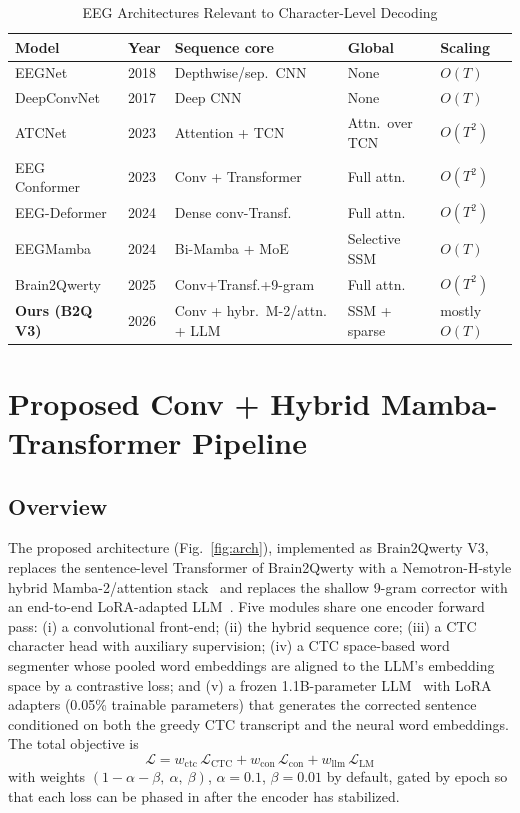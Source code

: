 \documentclass[conference]{IEEEtran}
\begin{document}
\begin{table}[t]
\centering
\caption{EEG Architectures Relevant to Character-Level Decoding}
\label{tab:eeg}
\scriptsize
\begin{tabular}{@{}lllll@{}}
\toprule
\textbf{Model} & \textbf{Year} & \textbf{Sequence core} & \textbf{Global} & \textbf{Scaling} \\
\midrule
EEGNet~\cite{lawhern2018eegnet} & 2018 & Depthwise/sep.\ CNN & None & $O(T)$ \\
DeepConvNet~\cite{schirrmeister2017} & 2017 & Deep CNN & None & $O(T)$ \\
ATCNet~\cite{altaheri2023atcnet} & 2023 & Attention + TCN & Attn.\ over TCN & $O(T^2)$ \\
EEG Conformer~\cite{song2023conformer} & 2023 & Conv + Transformer & Full attn. & $O(T^2)$ \\
EEG-Deformer~\cite{ding2024deformer} & 2024 & Dense conv-Transf. & Full attn. & $O(T^2)$ \\
EEGMamba~\cite{gui2024eegmamba} & 2024 & Bi-Mamba + MoE & Selective SSM & $O(T)$ \\
Brain2Qwerty~\cite{levy2025} & 2025 & Conv+Transf.+9-gram & Full attn. & $O(T^2)$ \\
\textbf{Ours (B2Q V3)} & 2026 & Conv + hybr.\ M-2/attn. + LLM & SSM + sparse & mostly $O(T)$ \\
\bottomrule
\end{tabular}
\end{table}

\section{Proposed Conv + Hybrid Mamba-Transformer Pipeline}

\subsection{Overview}
The proposed architecture (Fig.~\ref{fig:arch}), implemented as Brain2Qwerty
V3, replaces the sentence-level Transformer of Brain2Qwerty with a
Nemotron-H-style hybrid Mamba-2/attention stack~\cite{nvidia2025nemotronh}
and replaces the shallow 9-gram corrector with an end-to-end LoRA-adapted
LLM~\cite{hu2022lora}. Five modules share one encoder forward pass: (i) a
convolutional front-end; (ii) the hybrid sequence core; (iii) a CTC
character head with auxiliary supervision; (iv) a CTC space-based word
segmenter whose pooled word embeddings are aligned to the LLM's embedding
space by a contrastive loss; and (v) a frozen 1.1B-parameter
LLM~\cite{llama3} with LoRA adapters (0.05\% trainable parameters) that
generates the corrected sentence conditioned on both the greedy CTC
transcript and the neural word embeddings. The total objective is
\begin{equation}
\mathcal{L} = w_{\mathrm{ctc}}\,\mathcal{L}_{\mathrm{CTC}}
+ w_{\mathrm{con}}\,\mathcal{L}_{\mathrm{con}}
+ w_{\mathrm{llm}}\,\mathcal{L}_{\mathrm{LM}}
\end{equation}
with weights $(1-\alpha-\beta,\ \alpha,\ \beta)$, $\alpha=0.1$, $\beta=0.01$
by default, gated by epoch so that each loss can be phased in after the
encoder has stabilized.
\end{document}
